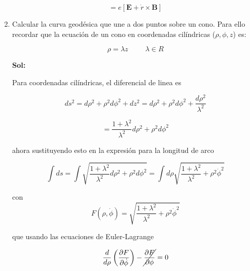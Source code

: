 \documentclass[12pt,a4paper]{article}
\begin{document}
\begin{enumerate}
    \begin{equation*}
       = e \left[\mathbf{E} + \dot{r} \times \mathbf{B} \right]
    \end{equation*}
    
    
    
    
        
        
        
        \item Calcular la curva geodésica que une a dos puntos sobre un cono. Para ello recordar que la ecuación de un cono en coordenadas cilíndricas ($\rho, \phi, z$) es:
        
        \begin{equation*}
            \rho = \lambda z \hspace{1cm} \lambda \in R
        \end{equation*}
        
        \textbf{Sol:}
        
        Para coordenadas cilíndricas, el diferencial de linea es
        
        \begin{equation*}
            ds^2 = d\rho^2 + \rho^2 d\phi^2 + dz^2 = d\rho^2 + \rho^2 d\phi^2 + \frac{d\rho^2}{\lambda^2}
        \end{equation*}
        
        \begin{equation*}
            = \frac{1 + \lambda^2}{\lambda^2} d \rho^2 + \rho^2 d\phi^2
        \end{equation*}
        
        ahora sustituyendo esto en la expresión para la longitud de arco
        
        \begin{equation*}
            \int ds = \int \sqrt{\frac{1 + \lambda^2}{\lambda^2} d \rho^2 + \rho^2 d\phi^2} = \int d\rho \sqrt{\frac{1 + \lambda^2}{\lambda^2} + \rho^2 \dot{\phi}^2}
        \end{equation*}
        
        con \begin{equation*}
            F(\rho, \dot{\phi}) =\sqrt{ \frac{1 + \lambda^2}{\lambda^2} + \rho^2 \dot{\phi}^2}
        \end{equation*}
        
        que usando las ecuaciones de Euler-Lagrange
        
        \begin{equation*}
            \frac{d}{d\rho} \left(\frac{\partial F}{\partial \dot{\phi}}\right) - \cancel{\frac{\partial F}{\partial \phi}} = 0
        \end{equation*}
        

\end{enumerate}
\end{document}
